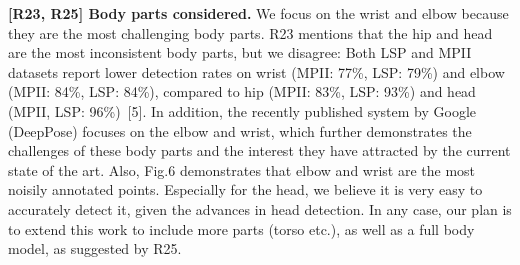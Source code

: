 \documentclass[10pt,twocolumn,letterpaper]{article}
\begin{document}




\textbf{[R23, R25] Body parts considered.} 
We  focus on the wrist and elbow because they are the most challenging body parts. R23 mentions that the hip and head are the most inconsistent body parts, but we disagree: Both LSP and MPII datasets report lower detection rates on wrist (MPII: 77\%, LSP: 79\%) and elbow (MPII: 84\%, LSP: 84\%), compared to hip (MPII: 83\%, LSP: 93\%) and head (MPII, LSP: 96\%)~[5]. In addition, the recently published system by Google (DeepPose) focuses on the elbow and wrist, which further demonstrates the challenges of these body parts and the interest they have attracted by the current state of the art. Also, Fig.6 demonstrates that elbow and wrist are the most noisily annotated points. Especially for the head, we believe it is very easy to accurately detect it, given the advances in head detection. In any case, our plan is to extend this work to include more parts (torso etc.), as well as a full body model, as suggested by R25.


\end{document}
